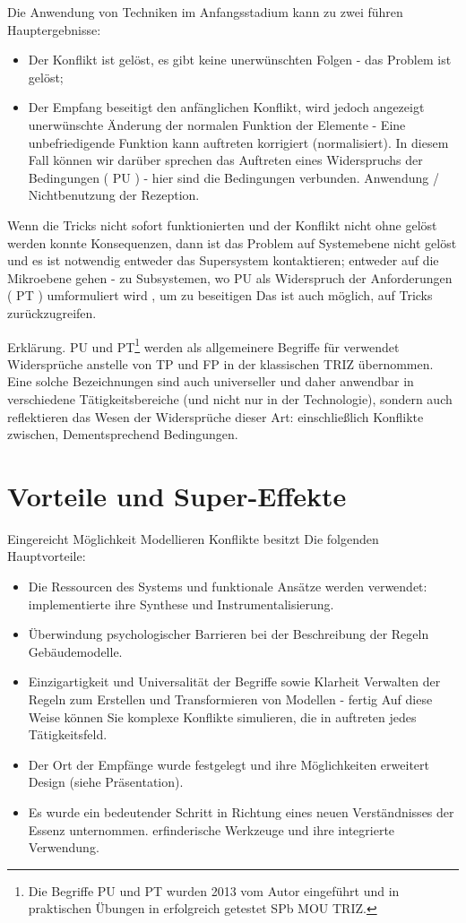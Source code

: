 \documentclass[11pt,a4paper]{article}
\begin{document}
Die Anwendung von Techniken im Anfangsstadium kann zu zwei führen
Hauptergebnisse:
\begin{itemize}
\item[1.] Der Konflikt ist gelöst, es gibt keine unerwünschten Folgen - das
  Problem ist gelöst;
\item[2.] Der Empfang beseitigt den anfänglichen Konflikt, wird jedoch
  angezeigt unerwünschte Änderung der normalen Funktion der Elemente - Eine
  unbefriedigende Funktion kann auftreten korrigiert (normalisiert). In diesem
  Fall können wir darüber sprechen das Auftreten eines Widerspruchs der
  Bedingungen ( PU ) - hier sind die Bedingungen verbunden.  Anwendung /
  Nichtbenutzung der Rezeption.
\end{itemize}
Wenn die Tricks nicht sofort funktionierten und der Konflikt nicht ohne gelöst
werden konnte Konsequenzen, dann ist das Problem auf Systemebene nicht gelöst
und es ist notwendig entweder das Supersystem kontaktieren; entweder auf die
Mikroebene gehen - zu Subsystemen, wo PU als Widerspruch der Anforderungen (
PT ) umformuliert wird , um zu beseitigen Das ist auch möglich, auf Tricks
zurückzugreifen.

Erklärung. PU und PT\footnote{Die Begriffe PU und PT wurden 2013 vom Autor
  eingeführt und in praktischen Übungen in erfolgreich getestet SPb MOU TRIZ.}
werden als allgemeinere Begriffe für verwendet Widersprüche anstelle von TP
und FP in der klassischen TRIZ übernommen. Eine solche Bezeichnungen sind auch
universeller und daher anwendbar in verschiedene Tätigkeitsbereiche (und nicht
nur in der Technologie), sondern auch reflektieren das Wesen der Widersprüche
dieser Art: einschließlich Konflikte zwischen, Dementsprechend Bedingungen.

\section*{Vorteile und Super-Effekte}
Eingereicht Möglichkeit Modellieren Konflikte besitzt Die folgenden
Hauptvorteile:
\begin{itemize}
\item Die Ressourcen des Systems und funktionale Ansätze werden verwendet:
implementierte ihre Synthese und Instrumentalisierung.
\item Überwindung psychologischer Barrieren bei der Beschreibung der Regeln
  Gebäudemodelle.
\item Einzigartigkeit und Universalität der Begriffe sowie Klarheit Verwalten
  der Regeln zum Erstellen und Transformieren von Modellen - fertig Auf diese
  Weise können Sie komplexe Konflikte simulieren, die in auftreten jedes
  Tätigkeitsfeld.
\item Der Ort der Empfänge wurde festgelegt und ihre Möglichkeiten erweitert
  Design (siehe Präsentation).
\item Es wurde ein bedeutender Schritt in Richtung eines neuen Verständnisses
  der Essenz unternommen.  erfinderische Werkzeuge und ihre integrierte
  Verwendung.
\end{itemize}
\end{document}
